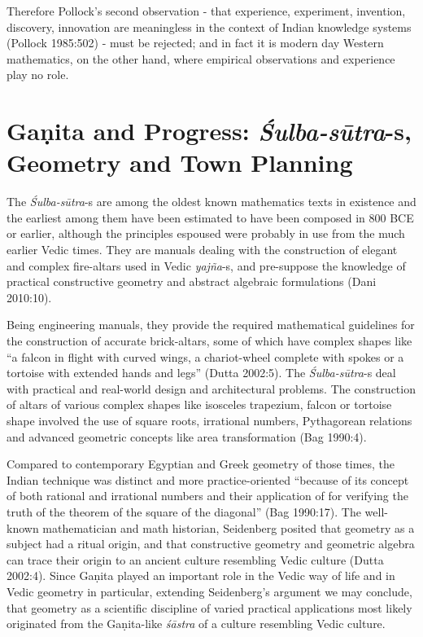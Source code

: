Therefore Pollock's second observation - that experience, experiment, invention, discovery, innovation are meaningless in the context of Indian knowledge systems (Pollock 1985:502) - must be rejected; and in fact it is modern day Western mathematics, on the other hand, where empirical observations and experience play no role.

\section*{Gaṇita and Progress: {\sl\bfseries Śulba-sūtra}-s, Geometry and Town Planning}

The {\sl Śulba-sūtra}-s are among the oldest known mathematics texts in existence and the earliest among them have been estimated to have been composed in 800 BCE or earlier, although the principles espoused were probably in use from the much earlier Vedic times. They are manuals dealing with the construction of elegant and complex fire-altars used in Vedic {\sl yajña}-s, and pre-suppose the knowledge of practical constructive geometry and abstract algebraic formulations (Dani 2010:10). 

Being engineering manuals, they provide the required mathematical guidelines for the construction of accurate brick-altars, some of which have complex shapes like ``a falcon in flight with curved wings, a chariot-wheel complete with spokes or a tortoise with extended hands and legs'' (Dutta 2002:5). The {\sl Śulba-sūtra}-s deal with practical and real-world design and architectural problems. The construction of altars of various complex shapes like isosceles trapezium, falcon or tortoise shape involved the use of square roots, irrational numbers, Pythagorean relations and advanced geometric concepts like area transformation (Bag 1990:4).

Compared to contemporary Egyptian and Greek geometry of those times, the Indian technique was distinct and more practice-oriented ``because of its concept of both rational and irrational numbers and their application of for verifying the truth of the theorem of the square of the diagonal'' (Bag 1990:17). The well-known mathematician and math historian, Seidenberg posited that geometry as a subject had a ritual origin, and that constructive geometry and geometric algebra can trace their origin to an ancient culture resembling Vedic culture (Dutta 2002:4). Since Gaṇita played an important role in the Vedic way of life and in Vedic geometry in particular, extending Seidenberg’s argument we may conclude, that geometry as a scientific discipline of varied practical applications most likely originated from the Gaṇita-like {\sl śāstra} of a culture resembling Vedic culture.

